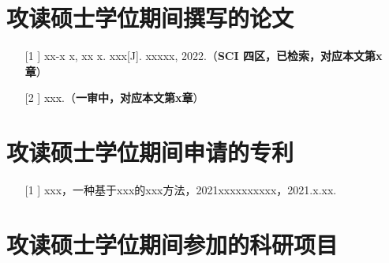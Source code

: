 \chapter{攻读硕士学位期间撰写的论文}


{

\begin{enumerate}[nosep]
    \item[[1]] xx-x x, xx x. xxx[J]. xxxxx, 2022.（\textbf{SCI 四区，已检索，对应本文第x章}）
\end{enumerate}

\begin{enumerate}[nosep]
    \item[[2]] xxx.（\textbf{一审中，对应本文第x章}）
\end{enumerate}

}


\chapter{攻读硕士学位期间申请的专利}



{


\begin{enumerate}[nosep]
    \item[[1]] xxx，一种基于xxx的xxx方法，2021xxxxxxxxxx，2021.x.xx. 
\end{enumerate}
}

\chapter{攻读硕士学位期间参加的科研项目}


